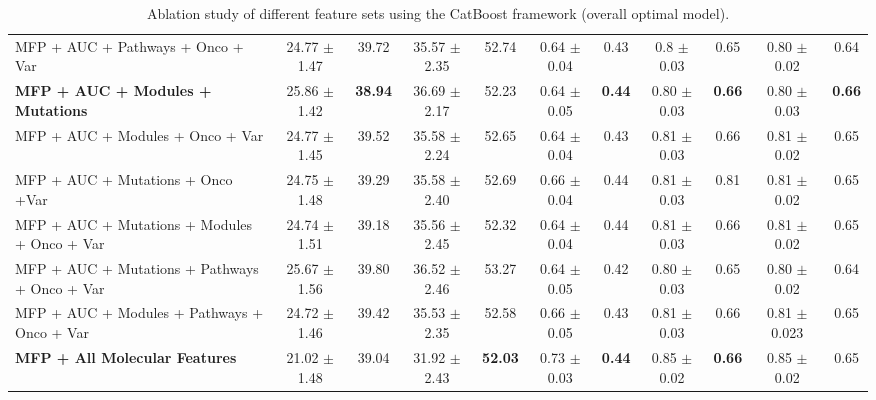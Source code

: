 \documentclass[pdflatex,sn-mathphys-num]{sn-jnl}%
\theoremstyle{thmstyleone}%
\theoremstyle{thmstyletwo}%
\theoremstyle{thmstylethree}%
\begin{document}
\begin{table}[!ht]
{\begin{tabular}{|l|c|c|c|c|c|c|c|c|c|c|}
MFP + AUC + Pathways + Onco + Var & 24.77 $\pm$ 1.47 & 39.72 & 35.57 $\pm$ 2.35 & 52.74 & 0.64 $\pm$ 0.04 & 0.43 & 0.8 $\pm$ 0.03 & 0.65 & 0.80 $\pm$ 0.02 & 0.64 \\
\textbf{MFP + AUC + Modules + Mutations} & 25.86 $\pm$ 1.42 & \textbf{38.94} & 36.69 $\pm$ 2.17 & 52.23 & 0.64 $\pm$ 0.05 & \textbf{0.44} & 0.80 $\pm$ 0.03 & \textbf{0.66} & 0.80 $\pm$ 0.03 & \textbf{0.66} \\
MFP + AUC + Modules + Onco + Var & 24.77 $\pm$ 1.45 & 39.52 & 35.58 $\pm$ 2.24 & 52.65 & 0.64 $\pm$ 0.04 & 0.43 & 0.81 $\pm$ 0.03 & 0.66 & 0.81 $\pm$ 0.02 & 0.65 \\
MFP + AUC + Mutations + Onco +Var & 24.75 $\pm$ 1.48 & 39.29 & 35.58 $\pm$ 2.40 & 52.69 & 0.66 $\pm$ 0.04 & 0.44 & 0.81 $\pm$ 0.03 & 0.81 & 0.81 $\pm$ 0.02 & 0.65 \\
MFP + AUC + Mutations + Modules + Onco + Var & 24.74 $\pm$ 1.51 & 39.18 & 35.56 $\pm$ 2.45 & 52.32 & 0.64 $\pm$ 0.04 & 0.44 & 0.81 $\pm$ 0.03 & 0.66 & 0.81 $\pm$ 0.02 & 0.65 \\
MFP + AUC + Mutations + Pathways + Onco + Var & 25.67 $\pm$ 1.56 & 39.80 & 36.52 $\pm$ 2.46 & 53.27 & 0.64 $\pm$ 0.05 & 0.42 & 0.80 $\pm$ 0.03 & 0.65 & 0.80 $\pm$ 0.02 & 0.64 \\
MFP + AUC + Modules + Pathways + Onco + Var & 24.72 $\pm$ 1.46 & 39.42 & 35.53 $\pm$ 2.35 & 52.58 & 0.66 $\pm$ 0.05 & 0.43 & 0.81 $\pm$ 0.03 & 0.66 & 0.81 $\pm$ 0.023 & 0.65 \\
\textbf{MFP + All Molecular Features} & 21.02 $\pm$ 1.48 & 39.04 & 31.92 $\pm$ 2.43 & \textbf{52.03} & 0.73 $\pm$ 0.03 & \textbf{0.44} & 0.85 $\pm$ 0.02 & \textbf{0.66} & 0.85 $\pm$ 0.02 & 0.65 \\
\hline
\end{tabular}
}
\caption{Ablation study of different feature sets using the CatBoost framework (overall optimal model).}
\label{table:t2}
\end{table}
\end{document}
